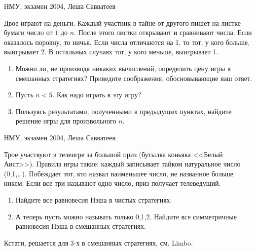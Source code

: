 \begin{problem}
\begin{source}
НМУ, экзамен 2004, Леша Савватеев
\end{source}
Двое играют на деньги. Каждый участник в тайне от другого пишет на листке бумаги число от $1$ до $n$. После этого листки открывают и сравнивают числа. Если оказалось поровну, то ничья. Если числа отличаются на 1, то тот, у кого больше, выигрывает 2. В остальных случаях тот, у кого меньше, выигрывает 1.
\begin{enumerate}
\item Можно ли, не производя никаких вычислений, определить цену игры в смешанных стратегиях? Приведите соображения, обосновывающие ваш ответ.
\item Пусть $n<5$. Как надо играть в эту игру?
\item Пользуясь результатами, полученными в предыдущих пунктах, найдите решение игры для произвольного $n$.
\end{enumerate}






\begin{sol}

\end{sol}
\end{problem}




\begin{problem}
\begin{source}
НМУ, экзамен 2004, Леша Савватеев
\end{source}
Трое участвуют в телеигре за большой приз (бутылка коньяка <<Белый Аист>>). Правила игры такие: каждый записывает тайком натуральное число (0,1,\ldots ). Побеждает тот, кто назвал наименьшее число, не названное больше никем. Если все три называют одно число, приз получает телеведущий.
\begin{enumerate}
\item Найдите все равновесия Нэша в чистых стратегиях.
\item А теперь пусть можно называть только 0,1,2. Найдите все симметричные равновесия Нэша в смешанных стратегиях.
\end{enumerate}

\begin{sol}
Кстати, решается для 3-х в смешанных стратегиях, см. Limbo.
\end{sol}
\end{problem}



